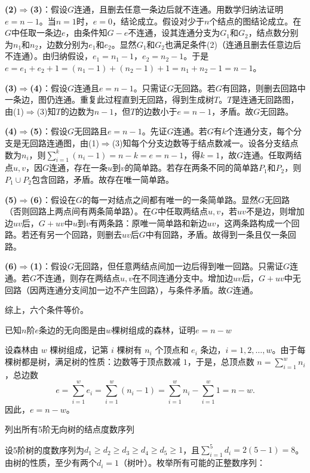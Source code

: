 \textbf{(2)$\Rightarrow$(3)}：假设$G$连通，且删去任意一条边后就不连通。用数学归纳法证明$e=n-1$。当$n=1$时，$e=0$，结论成立。假设对少于$n$个结点的图结论成立。在$G$中任取一条边$e$，由条件知$G-e$不连通，设其连通分支为$G_1$和$G_2$，结点数分别为$n_1$和$n_2$，边数分别为$e_1$和$e_2$。显然$G_1$和$G_2$也满足条件(2)（连通且删去任意边后不连通）。由归纳假设，$e_1=n_1-1$，$e_2=n_2-1$。于是$e=e_1+e_2+1=(n_1-1)+(n_2-1)+1=n_1+n_2-1=n-1$。

\textbf{(3)$\Rightarrow$(4)}：假设$G$连通且$e=n-1$。只需证$G$无回路。若$G$有回路，则删去回路中一条边，图仍连通。重复此过程直到无回路，得到生成树$T$。$T$是连通无回路图，由(1)$\Rightarrow$(3)知$T$的边数为$n-1$，但$T$的边数小于$e=n-1$，矛盾。故$G$无回路。

\textbf{(4)$\Rightarrow$(5)}：假设$G$无回路且$e=n-1$。先证$G$连通。若$G$有$k$个连通分支，每个分支是无回路连通图，由(1)$\Rightarrow$(3)知每个分支边数等于结点数减一。设各分支结点数为$n_i$，则$\sum_{i=1}^k (n_i-1)=n-k=e=n-1$，得$k=1$，故$G$连通。任取两结点$u,v$，因$G$连通，存在一条$u$到$v$的简单路。若存在两条不同的简单路$P_1$和$P_2$，则$P_1\cup P_2$包含回路，矛盾。故存在唯一简单路。

\textbf{(5)$\Rightarrow$(6)}：假设在$G$的每一对结点之间都有唯一的一条简单路。显然$G$无回路（否则回路上两点间有两条简单路）。在$G$中任取两结点$u,v$，若$uv$不是边，则增加边$uv$后，$G+uv$中$u$到$v$有两条路：原唯一简单路和新边$uv$，这两条路构成一个回路。若还有另一个回路，则删去$uv$后$G$中有回路，矛盾。故得到一条且仅一条回路。

\textbf{(6)$\Rightarrow$(1)}：假设$G$无回路，但任意两结点间加一边后得到唯一回路。只需证$G$连通。若$G$不连通，则存在两结点$u,v$在不同连通分支中。增加边$uv$后，$G+uv$中无回路（因两连通分支间加一边不产生回路），与条件矛盾。故$G$连通。

综上，六个条件等价。
\begin{example}{}{}
    已知$n$阶$e$条边的无向图是由$w$棵树组成的森林，证明$e=n-w$
\end{example}
设森林由 $w$ 棵树组成，记第 $i$ 棵树有 $n_i$ 个顶点和 $e_i$ 条边，$i=1,2,\dots,w$。由于每棵树都是树，满足树的性质：边数等于顶点数减 $1$，于是，总顶点数 $n = \sum_{i=1}^w n_i$，总边数
    \[
    e = \sum_{i=1}^w e_i = \sum_{i=1}^w (n_i - 1) = \sum_{i=1}^w n_i - \sum_{i=1}^w 1 = n - w.
    \]
    因此，$e = n - w$。
\begin{example}{}{}
列出所有5阶无向树的结点度数序列
\end{example}
设5阶树的度数序列为$d_1 \ge d_2 \ge d_3 \ge d_4 \ge d_5 \ge 1$，且$\displaystyle\sum_{i=1}^5 d_i = 2(5-1) = 8$。由树的性质，至少有两个$d_i = 1$（树叶）。枚举所有可能的正整数序列：

